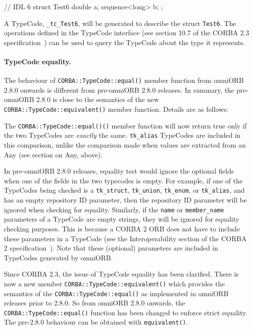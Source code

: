 \documentclass[11pt,twoside,a4paper]{book}
\newcommand{\type}[1]{\texttt{#1}}
\newcommand{\code}[1]{\texttt{#1}}
\newcommand{\op}[1]{\texttt{#1()}}
\newcommand{\dsc}{\discretionary{}{}{}}
\begin{document}
\begin{idllisting}
// IDL 6
struct Test6 {
  double a;
  sequence<long> b;
};
\end{idllisting}

A TypeCode, \code{\_tc\_Test6}, will be generated to describe the
struct \type{Test6}. The operations defined in the TypeCode interface
(see section 10.7 of the CORBA 2.3 specification~\cite{corba23-spec})
can be used to query the TypeCode about the type it represents.


\paragraph*{TypeCode equality.}

The behaviour of \op{CORBA::TypeCode::equal} member function from
omniORB 2.8.0 onwards is different from pre-omniORB 2.8.0 releases.
In summary, the pre-omniORB 2.8.0 is close to the semantics of the new
\op{CORBA::TypeCode::equivalent} member function. Details are as
follows:

The \op{CORBA::TypeCode::equal()} member function will now return true
only if the two TypeCodes are \emph{exactly} the same.
\code{tk\_alias} TypeCodes are included in this comparison, unlike the
comparison made when values are extracted from an Any (see section on
Any, above).

In pre-omniORB 2.8.0 releases, equality test would ignore the optional
fields when one of the fields in the two typecodes is empty. For
example, if one of the TypeCodes being checked is a \code{tk\_struct},
\code{tk\_union}, \code{tk\_enum}, or \code{tk\_alias}, and has an
empty repository ID parameter, then the repository ID parameter will
be ignored when checking for equality.  Similarly, if the \code{name}
or \code{member\_name} parameters of a TypeCode are empty strings,
they will be ignored for equality checking purposes. This is because a
CORBA 2 ORB does not have to include these parameters in a TypeCode
(see the Interoperability section of the CORBA 2
specification~\cite{corba2-spec}). Note that these (optional)
parameters are included in TypeCodes generated by omniORB.

Since CORBA 2.3, the issue of TypeCode equality has been clarified.
There is now a new member \op{CORBA::TypeCode::equivalent} which
provides the semantics of the \op{CORBA::TypeCode::equal} as
implemented in omniORB releases prior to 2.8.0. So from omniORB 2.8.0
onwards, the \op{CORBA::TypeCode::\dsc{}equal} function has been
changed to enforce strict equality.  The pre-2.8.0 behaviour can be
obtained with \op{equivalent}.
\end{document}

